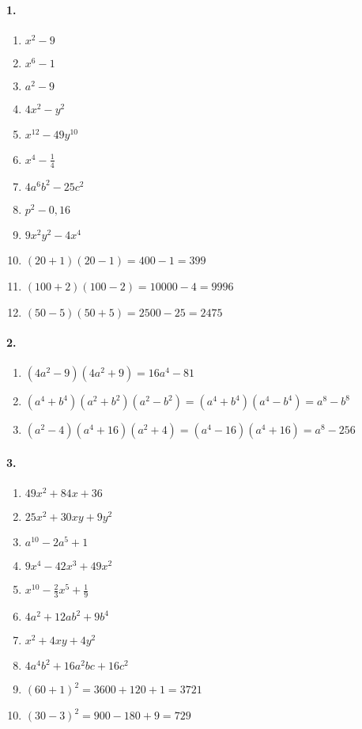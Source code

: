 \documentclass[a4paper,12pt]{article}
\begin{document}
\paragraph*{1.}
\begin{enumerate}
  \item \(x^2-9\)
  \item \(x^6-1\)
  \item \(a^2-9\)
  \item \(4x^2-y^2\)
  \item \(x^{12}-49y^{10}\)
  \item \(x^4-\tfrac{1}{4}\)
  \item \(4a^6b^2-25c^2\)
  \item \(p^2-0{,}16\)
  \item \(9x^2y^2-4x^4\)
  \item \((20+1)(20-1)=400-1=399\)
  \item \((100+2)(100-2)=10000-4=9996\)
  \item \((50-5)(50+5)=2500-25=2475\)
\end{enumerate}

\paragraph*{2.}
\begin{enumerate}
  \item \((4a^2-9)(4a^2+9)=16a^4-81\)
  \item \((a^4+b^4)(a^2+b^2)(a^2-b^2)=(a^4+b^4)(a^4-b^4)=a^8-b^8\)
  \item \((a^2-4)(a^4+16)(a^2+4)=(a^4-16)(a^4+16)=a^8-256\)
\end{enumerate}

\paragraph*{3.}
\begin{enumerate}
  \item \(49x^2+84x+36\)
  \item \(25x^2+30xy+9y^2\)
  \item \(a^{10}-2a^5+1\)
  \item \(9x^4-42x^3+49x^2\)
  \item \(x^{10}-\tfrac{2}{3}x^5+\tfrac{1}{9}\)
  \item \(4a^2+12ab^2+9b^4\)
  \item \(x^2+4xy+4y^2\)
  \item \(4a^4b^2+16a^2bc+16c^2\)
  \item \((60+1)^2=3600+120+1=3721\)
  \item \((30-3)^2=900-180+9=729\)
\end{enumerate}
\end{document}
